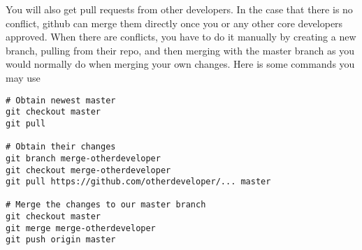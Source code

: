 \documentclass[runningheads,letterpaper]{llncs}
\begin{document}
You will also get pull requests from other developers.
In the case that there is no conflict, github can merge them directly once you or any other core developers approved.
When there are conflicts, you have to do it manually by creating a new branch, pulling from their repo, and then merging with the master branch as you would normally do when merging your own changes.
Here is some commands you may use
\begin{verbatim}
# Obtain newest master
git checkout master
git pull

# Obtain their changes
git branch merge-otherdeveloper
git checkout merge-otherdeveloper
git pull https://github.com/otherdeveloper/... master

# Merge the changes to our master branch
git checkout master
git merge merge-otherdeveloper
git push origin master
\end{verbatim}
\end{document}
